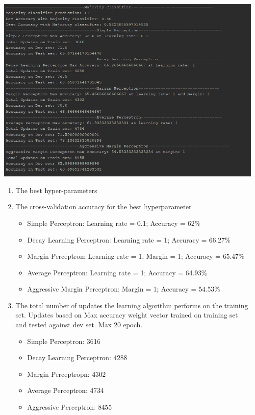 \begin{enumerate}
\includegraphics[width=\textwidth]{accuracies.PNG}\\
  \begin{enumerate}
  \item The best hyper-parameters

  \item The cross-validation accuracy for the best hyperparameter 
    \begin{itemize}
      \item Simple Perceptron: Learning rate = 0.1; Accuracy = 62\%
      \item Decay Learning Perceptron: Learning rate = 1; Accuracy = 66.27\%
      \item Margin Perceptron: Learning rate = 1, Margin = 1; Accuracy = 65.47\%
      \item Average Perceptron: Learning rate = 1; Accuracy = 64.93\%
      \item Aggressive Margin Perceptron: Margin = 1; Accuracy = 54.53\%
  \end{itemize}
  \item The total number of updates the learning algorithm performs on the training set.
  Updates based on Max accuracy weight vector trained on training set and tested against dev set. Max 20 epoch.
  \begin{itemize}
      \item Simple Perceptron: 3616
      \item Decay Learning Perceptron: 4288
      \item Margin Perceptropn: 4302
      \item Average Perceptron: 4734
      \item Aggressive Perceptron: 8455
  \end{itemize}
  

\end{enumerate}
\end{enumerate}
